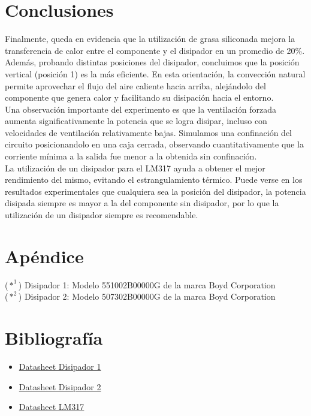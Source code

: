 \documentclass[conference]{IEEEtran}
\begin{document}
    \section{Conclusiones}

    Finalmente, queda en evidencia que la utilización de grasa siliconada mejora la transferencia de calor entre el
    componente y el disipador en un promedio de 20\%. 
    \\Además, probando distintas posiciones del disipador, concluimos que la posición vertical (posición 1) es la más eficiente.
    En esta orientación, la convección natural permite aprovechar el flujo del aire caliente hacia arriba, alejándolo del componente que 
    genera calor y facilitando su disipación hacia el entorno.\\Una observación importante del experimento
    es que la ventilación forzada aumenta significativamente la potencia que se logra disipar, incluso con velocidades de ventilación relativamente bajas.
    Simulamos una confinación del circuito posicionandolo
    en una caja cerrada, observando cuantitativamente que la corriente mínima a la salida fue menor a la obtenida sin confinación.
    \\La utilización de un disipador para el LM317 ayuda a obtener el mejor rendimiento del mismo, evitando el estrangulamiento
    térmico. Puede verse en los resultados
    experimentales que cualquiera sea la posición del disipador, la potencia disipada siempre es mayor a la del
    componente sin disipador, por lo que la utilización de un disipador siempre es recomendable.

    \section{Apéndice}
    ($*^1$) Disipador 1: Modelo 551002B00000G de la marca Boyd Corporation\\
    ($*^2$) Disipador 2: Modelo 507302B00000G de la marca Boyd Corporation \\
    \section{Bibliografía}
    \begin{itemize}
        \item \href{https://www.digikey.com/en/products/detail/aavid-thermal-division-of-boyd-corporation/507302B00000G/5849}{Datasheet Disipador 1}
        \item \href{https://es.farnell.com/boyd/551002b00000g/heat-sink/dp/1339511}{Datasheet Disipador 2}
        \item \href{https://www.alldatasheet.es/datasheet-pdf/pdf/22749/STMICROELECTRONICS/LM317.html}{Datasheet LM317}
    \end{itemize}
\end{document}
